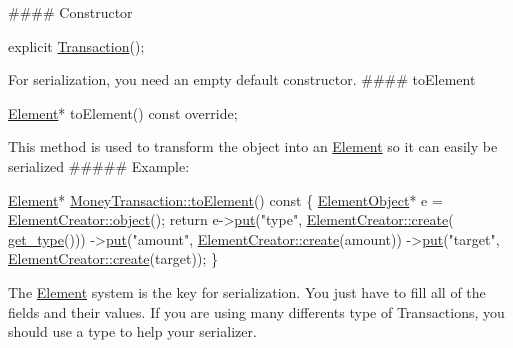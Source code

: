 \#\#\#\# Constructor 
\begin{DoxyCode}
\textcolor{keyword}{explicit} \mbox{\hyperlink{classTransaction}{Transaction}}();
\end{DoxyCode}
 For serialization, you need an empty default constructor. \#\#\#\# to\+Element 
\begin{DoxyCode}
\mbox{\hyperlink{classElement}{Element}}* toElement() \textcolor{keyword}{const override};
\end{DoxyCode}
 This method is used to transform the object into an \mbox{\hyperlink{classElement}{Element}} so it can easily be serialized \#\#\#\#\# Example\+: 
\begin{DoxyCode}
\mbox{\hyperlink{classElement}{Element}}* \mbox{\hyperlink{classMoneyTransaction_a84adc847266467965014cb04acd48bea}{MoneyTransaction::toElement}}()\textcolor{keyword}{ const }\{
    \mbox{\hyperlink{classElementObject}{ElementObject}}* e = \mbox{\hyperlink{classElementCreator_a9ecb3456bf27d6f9b3c9f5f8130cfe63}{ElementCreator::object}}();
    \textcolor{keywordflow}{return} e->\mbox{\hyperlink{classElementObject_ab9dd82037b752ab2e6f4e3de53348483}{put}}(\textcolor{stringliteral}{"type"}, \mbox{\hyperlink{classElementCreator_a4d2ee7d169ec568eb76e41dc0baaf314}{ElementCreator::create}}(
      \mbox{\hyperlink{classMoneyTransaction_a705918a47c0471ee7cf82bcdf0aeb5ef}{get\_type}}()))
            ->\mbox{\hyperlink{classElementObject_ab9dd82037b752ab2e6f4e3de53348483}{put}}(\textcolor{stringliteral}{"amount"}, \mbox{\hyperlink{classElementCreator_a4d2ee7d169ec568eb76e41dc0baaf314}{ElementCreator::create}}(amount))
            ->\mbox{\hyperlink{classElementObject_ab9dd82037b752ab2e6f4e3de53348483}{put}}(\textcolor{stringliteral}{"target"}, \mbox{\hyperlink{classElementCreator_a4d2ee7d169ec568eb76e41dc0baaf314}{ElementCreator::create}}(target));
\}
\end{DoxyCode}
 The \mbox{\hyperlink{classElement}{Element}} system is the key for serialization. You just have to fill all of the fields and their values. If you are using many differents type of Transactions, you should use a type to help your serializer.

